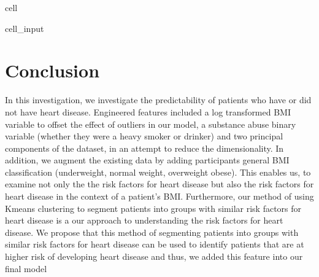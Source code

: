 \documentclass[letterpaper,10pt,english]{jupyterBook}
\begin{document}
\begin{sphinxuseclass}{cell}\begin{sphinxVerbatimInput}

\begin{sphinxuseclass}{cell_input}
\begin{sphinxVerbatim}[commandchars=\\\{\}]
  
\end{sphinxVerbatim}

\end{sphinxuseclass}\end{sphinxVerbatimInput}

\end{sphinxuseclass}
\sphinxstepscope


\chapter{Conclusion}
\label{\detokenize{Conclusion:conclusion}}\label{\detokenize{Conclusion::doc}}
\sphinxAtStartPar
In this investigation, we investigate the predictability of patients who have or did not have heart disease. Engineered features included a log transformed BMI variable to offset the effect of outliers in our model, a substance abuse binary variable (whether they were a heavy smoker or drinker) and two principal components of the dataset, in an attempt to reduce the dimensionality.  In addition, we augment the existing data by adding participants general BMI classification (underweight, normal weight, overweight obese). This enables us, to examine not only the the risk factors for heart disease but also the risk factors for heart disease in the context of a patient’s BMI.  Furthermore, our method of using K\sphinxhyphen{}means clustering to segment patients into groups with similar risk factors for heart disease is a our approach to understanding the risk factors for heart disease. We propose that this method of segmenting patients into groups with similar risk factors for heart disease can be used to identify patients that are at higher risk of developing heart disease and thus, we added this feature into our final model
\end{document}
